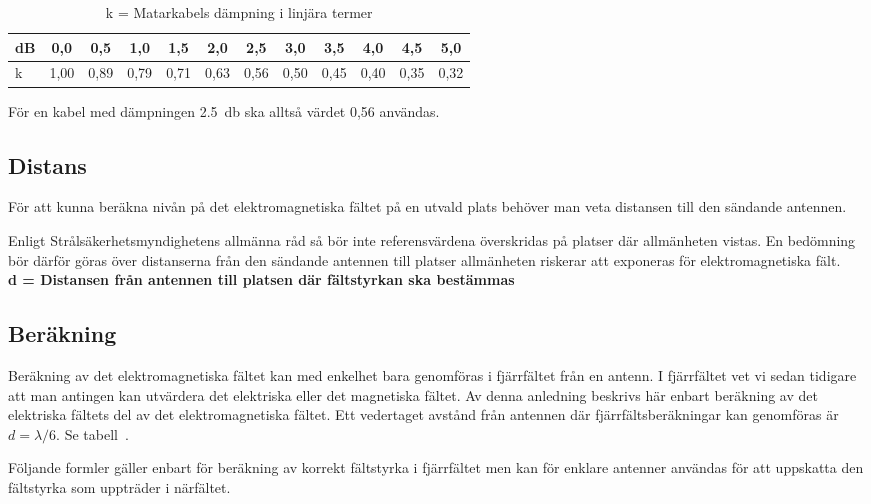 \begin{table*}[ht]
  \begin{center}
    \begin{tabular}{|l|c|c|c|c|c|c|c|c|c|c|c|}
	\hline
	dB & 0,0  & 0,5  & 1,0  & 1,5  & 2,0  & 2,5  & 3,0  & 3,5  & 4,0  & 4,5  & 5,0 \\ \hline
	k  & 1,00 & 0,89 & 0,79 & 0,71 & 0,63 & 0,56 & 0,50 & 0,45 & 0,40 & 0,35 & 0,32 \\ \hline
    \end{tabular}
    \caption{k = Matarkabels dämpning i linjära termer}
    \label{tab:feedannut}
  \end{center}
\end{table*}

För en kabel med dämpningen \qty{2,5}{\decibel} ska alltså värdet 0,56 användas.

\subsection{Distans}

För att kunna beräkna nivån på det elektromagnetiska fältet på en utvald plats
behöver man veta distansen till den sändande antennen.

Enligt Strålsäkerhetsmyndighetens allmänna råd så bör inte referensvärdena
överskridas på platser där allmänheten vistas.
En bedömning bör därför göras över distanserna från den sändande antennen till
platser allmänheten riskerar att exponeras för elektromagnetiska fält.
\\[1ex] %
\noindent\textbf{d = Distansen från antennen till platsen där fältstyrkan ska bestämmas}

\subsection{Beräkning}

Beräkning av det elektromagnetiska fältet kan med enkelhet bara
genomföras i fjärrfältet från en antenn.
I fjärrfältet vet vi sedan tidigare att man antingen kan utvärdera det
elektriska eller det magnetiska fältet.
Av denna anledning beskrivs här enbart beräkning av det elektriska fältets del av
det elektromagnetiska fältet.
Ett vedertaget avstånd från antennen där fjärrfältsberäkningar kan genomföras
är
\(d=\lambda / 6\). Se tabell~.

Följande formler gäller enbart för beräkning av korrekt fältstyrka i
fjärrfältet men kan för enklare antenner användas för att uppskatta den
fältstyrka som uppträder i närfältet.

